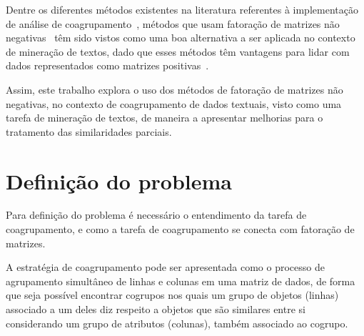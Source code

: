 \documentclass[
    12pt,                %
    oneside,            %
    a4paper,            %
    english,            %
    brazil                %
    ]{abntex2ppgsi}
\begin{document}
Dentre os diferentes métodos existentes na literatura referentes à implementação de análise de coagrupamento~\cite{Franca2010,Mirkin1996,Madeira2004}, métodos que usam fatoração de matrizes não negativas~\cite{lee:nnmf00, lee99} têm sido vistos como uma boa alternativa a ser aplicada no contexto de mineração de textos, dado que esses métodos têm vantagens para lidar com dados representados como matrizes positivas~\cite{Xu2003, Shahnaz2006373, Yoo2010}.

Assim, este trabalho explora o uso dos métodos de fatoração de matrizes não negativas, no contexto de coagrupamento de dados textuais, visto como uma tarefa de mineração de textos, de maneira a apresentar melhorias para o tratamento das similaridades parciais.


\section{Definição do problema}




Para definição do problema é necessário o entendimento da tarefa de coagrupamento, e como a tarefa de coagrupamento se conecta com fatoração de matrizes.

A estratégia de coagrupamento pode ser apresentada como o processo de agrupamento simultâneo de linhas e colunas em uma matriz de dados, de forma que seja possível encontrar cogrupos nos quais um grupo de objetos (linhas) associado a um deles diz respeito a objetos que são similares entre si considerando um grupo de atributos (colunas), também associado ao cogrupo.
\end{document}
